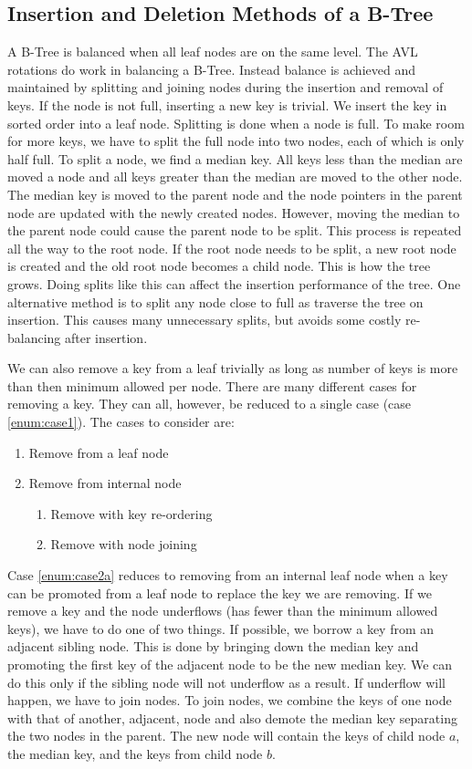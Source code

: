 \subsection*{Insertion and Deletion Methods of a B-Tree}
A B-Tree is balanced when all leaf nodes are on the same level.
The AVL rotations do work in balancing a B-Tree.
Instead balance is achieved and maintained by splitting and joining nodes during the insertion and removal of keys.
If the node is not full, inserting a new key is trivial.
We insert the key in sorted order into a leaf node.
Splitting is done when a node is full.  To make room for more keys, we have to split the full node into two nodes, each of which is only half full.
To split a node, we find a median key. 
All keys less than the median are moved a node and all keys greater than the median are moved to the other node.  
The median key is moved to the parent node and the node pointers in the parent node are updated with the newly created nodes.
However, moving the median to the parent node could cause the parent node to be split.  This process is repeated all the way to the root node.
If the root node needs to be split, a new root node is created and the old root node becomes a child node.  This is how the tree grows.
Doing splits like this can affect the insertion performance of the tree.
One alternative method is to split any node close to full as traverse the tree on insertion.  This causes many unnecessary splits, but avoids some costly re-balancing after insertion.

We can also remove a key from a leaf trivially as long as number of keys is more than then minimum allowed per node.
There are many different cases for removing a key.
They can all, however, be reduced to a single case (case \ref{enum:case1}).
The cases to consider are:
\begin{enumerate}
\item \label{enum:case1} Remove from a leaf node
\item \label{enum:case2} Remove from internal node
\begin{enumerate}
\item \label{enum:case2a} Remove with key re-ordering
\item \label{enum:case2b} Remove with node joining
\end{enumerate}
\end{enumerate}

Case \ref{enum:case2a} reduces to removing from an internal leaf node
when a key can be promoted from a leaf node to replace the key we are removing.
If we remove a key and the node underflows (has fewer than the minimum allowed keys), we have to do one of two things.  If possible, we borrow a key from an adjacent sibling node.
This is done by bringing down the median key and promoting the first key of the adjacent node to be the new median key.
We can do this only if the sibling node will not underflow as a result.  If underflow will happen, we have to join nodes.
To join nodes, we combine the keys of one node with that of another, adjacent, node and also demote the median key separating the two nodes in the parent.  The new node will contain the keys of child node $a$, the median key, and the keys from child node $b$.


